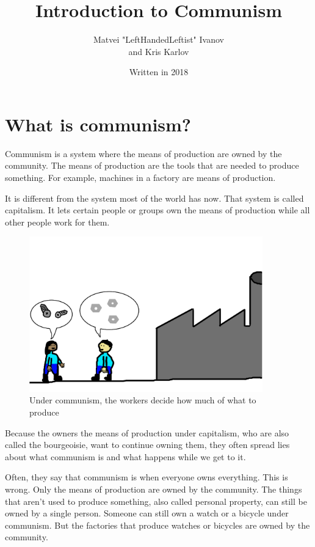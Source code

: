 \documentclass[a4paper]{book} %
\begin{document}
\fontsize{24}{28}\selectfont
\title{Introduction to Communism}
\author{Matvei "LeftHandedLeftist" Ivanov \\ and Kris Karlov}
\date{Written in 2018}
\maketitle
\fontsize{24}{28}\selectfont
\chapter{What is communism?}
Communism is a system where the means of production are owned by the community. The means of production are the tools that are needed to produce something. For example, machines in a factory are means of production.

It is different from the system most of the world has now. That system is called capitalism. It lets certain people or groups own the means of production while all other people work for them.

\begin{figure}[tbhp]
\centering
\includegraphics[width=0.9\textwidth]{1-1.png}
\caption{Under communism, the workers decide how much of what to produce}
\end{figure}

Because the owners the means of production under capitalism, who are also called the bourgeoisie, want to continue owning them, they often spread lies about what communism is and what happens while we get to it.

Often, they say that communism is when everyone owns everything. This is wrong. Only the means of production are owned by the community. The things that aren't used to produce something, also called personal property, can still be owned by a single person. Someone can still own a watch or a bicycle under communism. But the factories that produce watches or bicycles are owned by the community.
\end{document}
